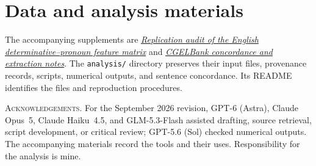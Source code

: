 \documentclass[12pt]{article}
\begin{document}
\section*{Data and analysis materials}

The accompanying supplements are \href{run:matrix-audit.pdf}{\textit{Replication audit of the English determinative--pronoun feature matrix}} and \href{run:corpus-documentation.pdf}{\textit{CGELBank concordance and extraction notes}}. The \texttt{analysis/} directory preserves their input files, provenance records, scripts, numerical outputs, and sentence concordance. Its README identifies the files and reproduction procedures.

\vspace{0.5\baselineskip}
\noindent\textsc{Acknowledgements.} For the September 2026 revision, GPT-6 (Astra), Claude Opus~5, Claude Haiku~4.5, and GLM-5.3-Flash assisted drafting, source retrieval, script development, or critical review; GPT-5.6 (Sol) checked numerical outputs. The accompanying materials record the tools and their uses. Responsibility for the analysis is mine.

\clearpage
\printbibliography
\end{document}
